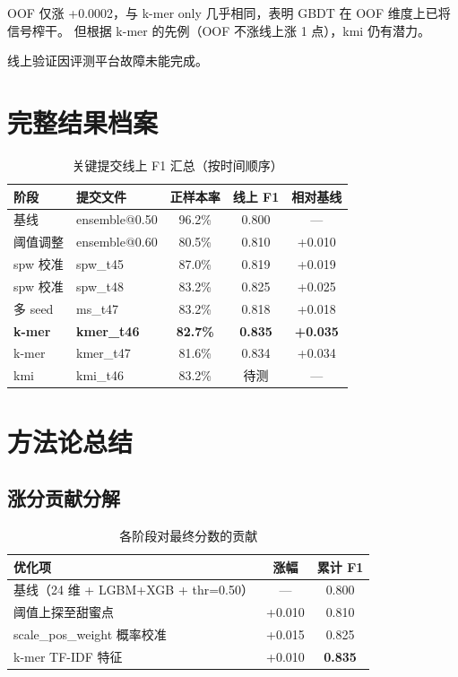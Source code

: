 \documentclass[11pt,a4paper]{article}
\begin{document}
OOF 仅涨 +0.0002，与 k-mer only 几乎相同，表明 GBDT 在 OOF 维度上已将信号榨干。
但根据 k-mer 的先例（OOF 不涨线上涨 1 点），kmi 仍有潜力。

线上验证因评测平台故障未能完成。

\section{完整结果档案}

\begin{table}[H]
\centering
\caption{关键提交线上 F1 汇总（按时间顺序）}
\begin{tabular}{llccc}
\toprule
阶段 & 提交文件 & 正样本率 & 线上 F1 & 相对基线 \\
\midrule
基线 & ensemble@0.50 & 96.2\% & 0.800 & --- \\
阈值调整 & ensemble@0.60 & 80.5\% & 0.810 & +0.010 \\
spw 校准 & spw\_t45 & 87.0\% & 0.819 & +0.019 \\
spw 校准 & spw\_t48 & 83.2\% & 0.825 & +0.025 \\
多 seed & ms\_t47 & 83.2\% & 0.818 & +0.018 \\
\textbf{k-mer} & \textbf{kmer\_t46} & \textbf{82.7\%} & \textbf{0.835} & \textbf{+0.035} \\
k-mer & kmer\_t47 & 81.6\% & 0.834 & +0.034 \\
kmi & kmi\_t46 & 83.2\% & 待测 & --- \\
\bottomrule
\end{tabular}
\end{table}

\section{方法论总结}

\subsection{涨分贡献分解}

\begin{table}[H]
\centering
\caption{各阶段对最终分数的贡献}
\begin{tabular}{lcc}
\toprule
优化项 & 涨幅 & 累计 F1 \\
\midrule
基线（24 维 + LGBM+XGB + thr=0.50） & --- & 0.800 \\
阈值上探至甜蜜点 & +0.010 & 0.810 \\
scale\_pos\_weight 概率校准 & +0.015 & 0.825 \\
k-mer TF-IDF 特征 & +0.010 & \textbf{0.835} \\
\bottomrule
\end{tabular}
\end{table}
\end{document}
